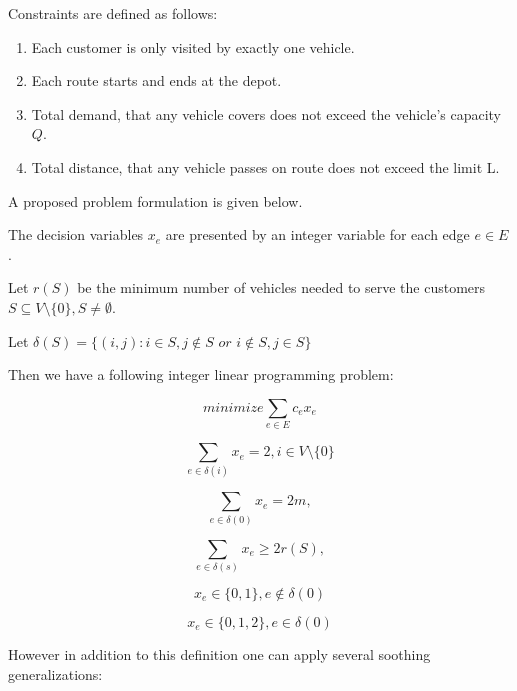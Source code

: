 \documentclass[11pt,a4paper,oneside]{book}
\begin{document}
Constraints are defined as follows:
\begin{enumerate}
\item Each customer is only visited by exactly one vehicle.
\item Each route starts and ends at the depot.
\item Total demand, that any vehicle covers does not exceed the vehicle's capacity $Q$.
\item Total distance, that any vehicle passes on route does not exceed the limit L. 
\end{enumerate}

A proposed problem formulation is given below.

The decision variables $x_e$ are presented by an integer variable for each edge $e \in E$.

Let $r(S)$ be the minimum number of vehicles needed to serve the customers $S \subseteq V\setminus\{0\}, S \neq \emptyset$.

Let $\delta(S)=\{(i,j):i \in S, j \notin \textit{S or i} \notin S, j \in S\}$

Then we have a following integer linear programming problem:

\begin{equation}
\label{eq:cvrp_obj}
minimize {\sum\limits_{e \in E} c_ex_e} 
\end{equation}

\begin{equation}
\label{eq:cvrp_constr1}
{\sum\limits_{e \in \delta(i)} x_e = 2}, i \in V\setminus\{0\}
\end{equation}

\begin{equation}
\label{eq:cvrp_constr2}
{\sum\limits_{e \in \delta(0)} x_e = 2m},
\end{equation}

\begin{equation}
\label{eq:cvrp_constr3}
{\sum\limits_{e \in \delta(s)} x_e \geq 2r(S)},
\end{equation}

\begin{equation}
\label{eq:cvrp_constr4}
x_e \in \{0,1\}, e \notin \delta(0)
\end{equation}

\begin{equation}
\label{eq:cvrp_constr5}
x_e \in \{0,1,2\}, e \in \delta(0)
\end{equation}


However in addition to this definition one can apply several soothing generalizations:
\end{document}
